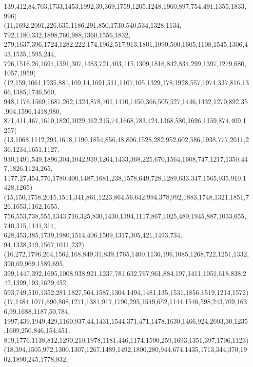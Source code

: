 \documentclass[a4paper,twopage,reqno,12pt]{amsart}
\theoremstyle{definition}
\numberwithin{equation}{section}
\begin{document}
\begin{enumerate}
{{139,412,84,703,1733,1453,1992,39,369,1759,1205,1248,1960,897,754,491,1355,1833,996)\\
(11,1692,2001,226,635,1186,291,850,1730,540,534,1328,1134, 792,1180,332,1898,760,988,1360,1556,1832,\\
279,1637,396,1724,1282,222,174,1962,517,913,1801,1090,500,1605,1108,1545,1306,443,1535,1595,244,\\
796,1516,26,1694,1591,307,1483,721,403,115,1309,1816,842,834,299,1397,1279,680,1057,1959)\\
(12,159,1061,1935,881,109,14,1691,511,1107,105,1329,178,1928,557,1974,337,816,1366,1385,1746,560,\\
948,1176,1569,1687,262,1324,878,701,1410,1450,366,505,527,1446,1432,1270,892,35,904,1596,1418,980,\\
871,411,467,1610,1820,1029,462,215,74,1668,783,424,1368,580,1696,1159,874,409,1257)\\
(13,1068,1112,293,1618,1190,1854,856,48,806,1528,282,952,602,586,1938,777,2011,236,1234,1651,1127,\\
930,1491,549,1896,304,1042,939,1264,1433,368,225,670,1564,1608,747,1217,1350,447,1826,1124,265,\\
1177,27,454,776,1780,400,1487,1681,238,1578,649,728,1289,633,347,1565,935,910,1428,1265)\\
(15,150,1758,2015,1511,341,861,1223,864,56,642,994,378,992,1883,1748,1321,1851,726,1653,1162,1655,\\
756,553,738,555,1343,716,325,830,1430,1394,1117,867,1025,480,1945,887,1033,655,740,315,1141,314,\\
628,453,385,1739,1980,1514,406,1509,1317,305,421,1493,734, 94,1338,349,1567,1011,232)\\
(16,272,1796,264,1562,168,849,31,839,1765,1400,1136,196,1085,1268,722,1251,1332,390,69,969,1589,695,\\
399,1447,392,1695,1008,938,921,1237,781,632,767,961,884,197,1411,1051,618,838,242,1399,193,1629,452,\\
593,749,510,1352,281,1827,564,1587,1304,1494,1481,135,1531,1856,1519,1214,1572)\\
(17,1484,1071,690,808,1271,1381,917,1790,295,1549,652,1144,1546,598,243,709,1636,99,1688,1187,50,784,\\
1997,439,1949,429,1160,937,44,1431,1544,371,471,1478,1630,1466,924,2003,30,1235,1609,250,846,154,451,\\
819,1776,1138,812,1290,210,1978,1181,446,1174,1590,259,1693,1351,397,1706,1123)\\
(18,394,1505,972,1300,1307,1267,1489,1492,1800,280,944,674,1435,1713,344,370,1902,1890,245,1778,832,\\
}}
\end{enumerate}
\end{document}
